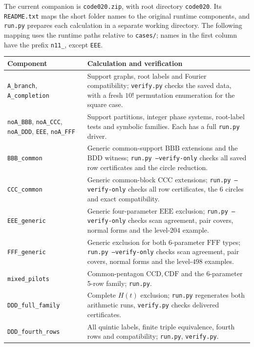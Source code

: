 \documentclass[11pt,a4paper]{article}
\theoremstyle{plain}
\theoremstyle{definition}
\theoremstyle{plain}
\begin{document}
\medskip
The current companion is \texttt{code020.zip}, with root directory \texttt{code020}. Its \texttt{README.txt} maps the short folder names to the original runtime components, and \texttt{run.py} prepares each calculation in a separate working directory. The following mapping uses the runtime paths relative to \texttt{cases/}; names in the first column have the prefix \texttt{n11\_}, except \texttt{EEE}.

\begin{center}\small
\begin{tabular}{@{}>{\raggedright\arraybackslash}p{}>{\raggedright\arraybackslash}p{}@{}}
\toprule
Component & Calculation and verification\\\midrule
\texttt{A\_branch}, \texttt{A\_completion}&Support graphs, root labels and Fourier compatibility; \texttt{verify.py} checks the saved data, with a fresh $10!$ permutation enumeration for the square case.\\
\texttt{noA\_BBB}, \texttt{noA\_CCC}, \texttt{noA\_DDD}, \texttt{EEE}, \texttt{noA\_FFF}&Support partitions, integer phase systems, root-label tests and symbolic families. Each has a full \texttt{run.py} driver.\\
\texttt{BBB\_common}&Generic common-support $\mathrm{BBB}$ extensions and the $\mathrm{BDD}$ witness; \texttt{run.py --verify-only} checks all saved row certificates and the circle reduction.\\
\texttt{CCC\_common}&Generic common-block $\mathrm{CCC}$ extensions; \texttt{run.py --verify-only} checks all row certificates, the $6$ circles and exact compatibility.\\
\texttt{EEE\_generic}&Generic four-parameter $\mathrm{EEE}$ exclusion; \texttt{run.py --verify-only} checks scan agreement, pair covers, normal forms and the level-$204$ example.\\
\texttt{FFF\_generic}&Generic exclusion for both 6-parameter $\mathrm{FFF}$ types; \texttt{run.py --verify-only} checks scan agreement, pair covers, normal forms and the level-$498$ examples.\\
\texttt{mixed\_pilots}&Common-pentagon $\mathrm{CCD},\mathrm{CDF}$ and the 6-parameter 5-row family; \texttt{run.py}.\\
\texttt{DDD\_full\_family}&Complete $H(t)$ exclusion; \texttt{run.py} regenerates both arithmetic runs, \texttt{verify.py} checks delivered certificates.\\
\texttt{DDD\_fourth\_rows}&All quintic labels, finite triple equivalence, fourth rows and compatibility; \texttt{run.py}, \texttt{verify.py}.\\

\end{tabular}
\end{center}
\end{document}

